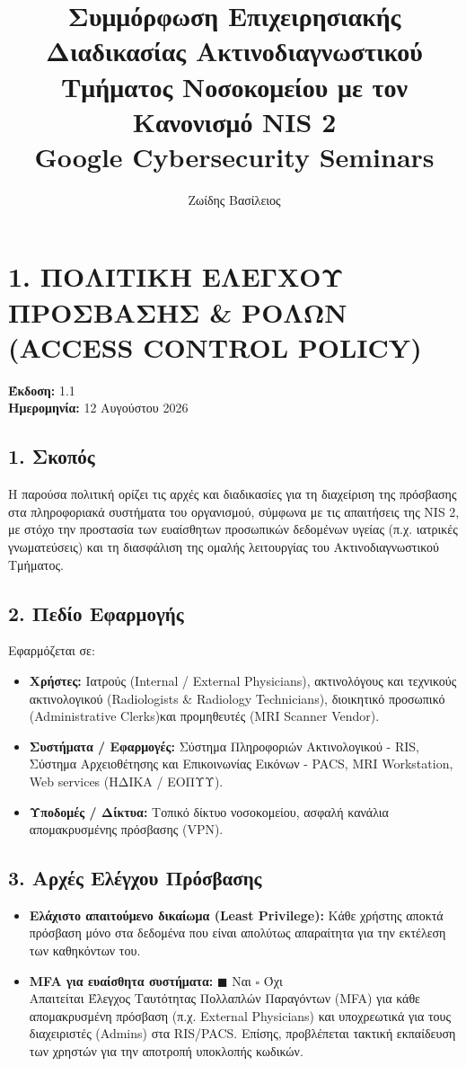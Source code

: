 \documentclass[11pt,a4paper]{article}
\title{\vspace{-2cm}Συμμόρφωση Επιχειρησιακής Διαδικασίας Ακτινοδιαγνωστικού Τμήματος Νοσοκομείου με τον Κανονισμό NIS 2\\[1ex] \large Google Cybersecurity Seminars}
\author{Ζωίδης Βασίλειος}
\date{}
\begin{document}
\maketitle

\section*{1. ΠΟΛΙΤΙΚΗ ΕΛΕΓΧΟΥ ΠΡΟΣΒΑΣΗΣ \& ΡΟΛΩΝ (ACCESS CONTROL POLICY)}
\textbf{Έκδοση:} 1.1\\
\textbf{Ημερομηνία:} 12 Αυγούστου 2026

\subsection*{1. Σκοπός}
Η παρούσα πολιτική ορίζει τις αρχές και διαδικασίες για τη διαχείριση της πρόσβασης στα πληροφοριακά συστήματα του οργανισμού, σύμφωνα με τις απαιτήσεις της NIS 2, με στόχο την προστασία των ευαίσθητων προσωπικών δεδομένων υγείας (π.χ. ιατρικές γνωματεύσεις) και τη διασφάλιση της ομαλής λειτουργίας του Ακτινοδιαγνωστικού Τμήματος.

\subsection*{2. Πεδίο Εφαρμογής}
Εφαρμόζεται σε:
\begin{itemize}
    \item \textbf{Χρήστες:} Ιατρούς (Internal / External Physicians), ακτινολόγους και τεχνικούς ακτινολογικού (Radiologists \& Radiology Technicians), διοικητικό προσωπικό (Administrative Clerks)και προμηθευτές (MRI Scanner Vendor).
    \item \textbf{Συστήματα / Εφαρμογές:} Σύστημα Πληροφοριών Ακτινολογικού - RIS, Σύστημα Αρχειοθέτησης και Επικοινωνίας Εικόνων - PACS, MRI Workstation, Web services (ΗΔΙΚΑ / ΕΟΠΥΥ).
    \item \textbf{Υποδομές / Δίκτυα:} Τοπικό δίκτυο νοσοκομείου, ασφαλή κανάλια απομακρυσμένης πρόσβασης (VPN).
\end{itemize}

\subsection*{3. Αρχές Ελέγχου Πρόσβασης}
\begin{itemize}
    \item \textbf{Ελάχιστο απαιτούμενο δικαίωμα (Least Privilege):} Κάθε χρήστης αποκτά πρόσβαση μόνο στα δεδομένα που είναι απολύτως απαραίτητα για την εκτέλεση των καθηκόντων του.
    \item \textbf{MFA για ευαίσθητα συστήματα:} $\blacksquare$ Ναι \quad $\square$ Όχι\\
    Απαιτείται Έλεγχος Ταυτότητας Πολλαπλών Παραγόντων (MFA) για κάθε απομακρυσμένη πρόσβαση (π.χ. External Physicians) και υποχρεωτικά για τους διαχειριστές (Admins) στα RIS/PACS. Επίσης, προβλέπεται τακτική εκπαίδευση των χρηστών για την αποτροπή υποκλοπής κωδικών.
\end{itemize}
\end{document}
